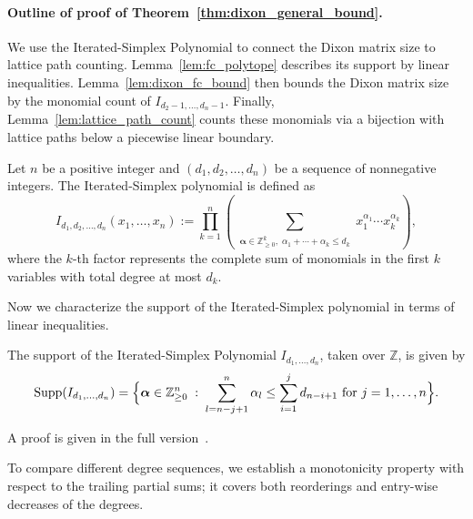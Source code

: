 \paragraph{Outline of proof of Theorem~\ref{thm:dixon_general_bound}.}
We use the Iterated-Simplex Polynomial to connect the Dixon matrix size to lattice path counting. Lemma~\ref{lem:fc_polytope} describes its support by linear inequalities. Lemma~\ref{lem:dixon_fc_bound} then bounds the Dixon matrix size by the monomial count of $I_{d_2-1,\ldots,d_n-1}$. Finally, Lemma~\ref{lem:lattice_path_count} counts these monomials via a bijection with lattice paths below a piecewise linear boundary.

\begin{definition}
	Let $n$ be a positive integer and $(d_1, d_2, \ldots, d_n)$ be a sequence of nonnegative integers. The Iterated-Simplex polynomial is defined as
	\begin{equation}
		I_{d_1,d_2,\ldots,d_n}(x_1, \ldots, x_n) := \prod_{k=1}^{n} \left( \sum_{\substack{\boldsymbol\alpha \in \mathbb{Z}_{\ge 0}^k,\; \alpha_1 + \cdots + \alpha_k \leq d_k}} x_1^{\alpha_1} \cdots x_k^{\alpha_k} \right),
		\label{eq:Iterated_Simplex_Polynomial}
	\end{equation}
	where the $k$-th factor represents the complete sum of monomials in the first $k$ variables with total degree at most $d_k$.
\end{definition}

Now we characterize the support of the Iterated-Simplex polynomial in terms of linear inequalities.

\begin{lemma}\label{lem:fc_polytope}
	The support of the Iterated-Simplex Polynomial $I_{d_1,\ldots,d_n}$, taken over $\mathbb{Z}$, is given by
\begin{equation}
  \mathrm{Supp}(I_{d_1,\ldots,d_n}) = 
  \Bigl\{ \boldsymbol\alpha \in \mathbb{Z}_{\ge 0}^n \;:\;
  \sum_{l=n-j+1}^n \alpha_l \le \sum_{i=1}^j d_{n-i+1}
  \text{ for } j=1, \ldots, n \Bigr\}.
  \label{eq:support}
\end{equation}
\end{lemma}

A proof is given in the full version~\cite{cryptoeprint:2026/1969}.

To compare different degree sequences, we establish a monotonicity property with respect to the trailing partial sums; it covers both reorderings and entry-wise decreases of the degrees.

